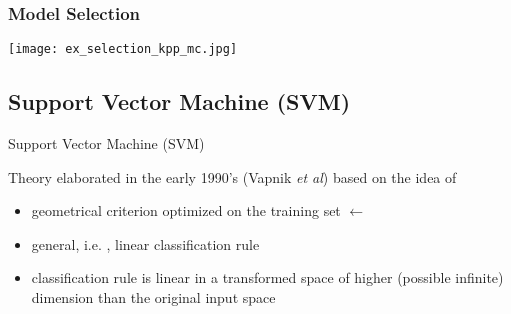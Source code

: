 \begin{frame}
  \frametitle{Model Selection}
  \begin{center}
    \texttt{[image: ex\_selection\_kpp\_mc.jpg]}
  \end{center}
\end{frame}



\subsection{Support Vector Machine (SVM)}
\begin{frame}{Support Vector Machine (SVM)}

Theory elaborated in the early 1990's (Vapnik {\em et al}) based on the idea of {}

\begin{itemize}
 \item geometrical criterion optimized on the training set $\leftarrow$  
 \item[\doigt] general, i.e. , linear classification rule
 \item[\doigt] classification rule is linear in a transformed space of higher (possible infinite) dimension than the original input space
\end{itemize}


\end{frame}


